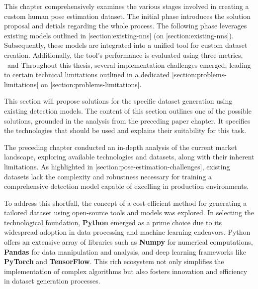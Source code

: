 This chapter comprehensively examines the various stages involved in creating a custom human pose estimation dataset. The initial phase introduces the solution proposal and detials regarding the whole process. The following phase leverages existing models outlined in [section:existing-nns] (on [section:existing-nns]). Subsequently, these models are integrated into a unified tool for custom dataset creation. Additionally, the tool's performance is evaluated using three metrics, \OKS\, \APE\ and \MSE\.

Throughout this thesis, several implementation challenges emerged, leading to certain technical limitations outlined in a dedicated [section:problems-limitations] on [section:problems-limitations].

This section will propose solutions for the specific dataset generation using existing {\bf \NN} detection models. The content of this section outlines one of the possible solutions, grounded in the analysis from the preceding paper chapter. It specifies the technologies that should be used and explains their suitability for this task.

The preceding chapter conducted an in-depth analysis of the current market landscape, exploring available technologies and datasets, along with their inherent limitations. As highlighted in [section:pose-estimation-challenges], existing datasets lack the complexity and robustness necessary for training a comprehensive detection model capable of excelling in production environments.

To address this shortfall, the concept of a cost-efficient method for generating a tailored dataset using open-source tools and models was explored. In selecting the technological foundation, {\bf Python} emerged as a prime choice due to its widespread adoption in data processing and machine learning endeavors. Python offers an extensive array of libraries such as {\bf Numpy} for numerical computations, {\bf Pandas} for data manipulation and analysis, and deep learning frameworks like {\bf PyTorch} and {\bf TensorFlow}. This rich ecosystem not only simplifies the implementation of complex algorithms but also fosters innovation and efficiency in dataset generation processes.

